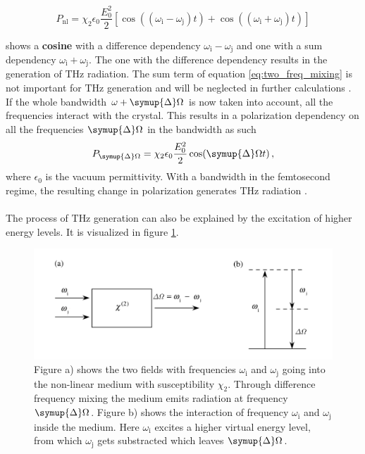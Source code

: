 \begin{equation}
    P_\text{nl} = \chi_2 \epsilon_0 \frac{E_0^2}{2}\left[\cos((\omega_\text{i} - \omega_\text{j})t) + \cos((\omega_\text{i} + \omega_\text{j})t)\right]
\label{eq:two_freq_mixing}
\end{equation}

shows a \textbf{cosine} with a difference dependency $\omega_\text{i}-\omega_\text{j}$ and one with a sum dependency $\omega_\text{i}+\omega_\text{j}$.
The one with the difference dependency results in the generation of $\si{\tera\hertz}$ radiation. %
The sum term of equation \eqref{eq:two_freq_mixing} is not important for $\si{\tera\hertz}$ generation and will be neglected in further calculations \cite{wiki_book}.
If the whole bandwidth $\omega + \symup{\Delta}\Omega$ is now taken into account, all the frequencies interact with the crystal.
This results in a polarization dependency on all the frequencies $\symup{\Delta}\Omega$ in the bandwidth as such
\begin{equation}
    P_{\symup{\Delta}\Omega} = \chi_2 \epsilon_0 \frac{E_0^2}{2}\cos(\symup{\Delta}\Omega t) \, ,
    \label{eq:polarization_depens}
\end{equation}
where $\epsilon_0$ is the vacuum permittivity.
With a bandwidth in the femtosecond regime, the resulting change in polarization generates $\si{\tera\hertz}$ radiation \cite{book_optical_rectification}\cite{wiki_book}.
\\\\
The process of $\si{\tera\hertz}$ generation can also be explained by the excitation of higher energy levels.
It is visualized in figure \ref{fig:freq_mix}.
\begin{figure}
    \centering
    \includegraphics[width=\textwidth]{refferenced_pic/diffrence_frequency_mixing.PNG}
    \caption{Figure a) shows the two fields with frequencies $\omega_\text{i} $ and $\omega_\text{j}$ going into the non-linear medium with susceptibility $\chi_2$.
    Through difference frequency mixing the medium emits radiation at frequency $\symup{\Delta}\Omega$.
    Figure b) shows the interaction of frequency $\omega_\text{i} $ and $\omega_\text{j}$ inside the medium.
    Here $\omega_\text{i}$ excites a higher virtual energy level, from which $\omega_\text{j}$ gets substracted which leaves $\symup{\Delta}\Omega$.}
    \label{fig:freq_mix}
\end{figure}
